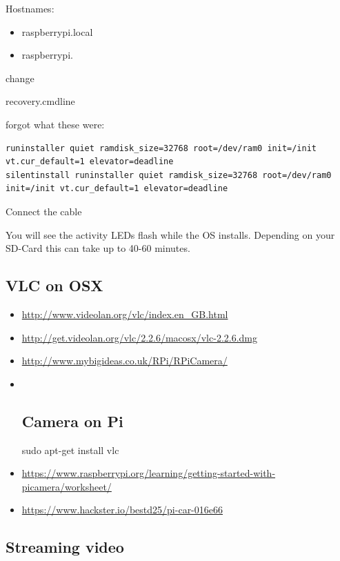 Hostnames:

\begin{itemize}
\tightlist
\item
  raspberrypi.local
\item
  raspberrypi.
\end{itemize}

change

recovery.cmdline

forgot what these were:

\begin{verbatim}
runinstaller quiet ramdisk_size=32768 root=/dev/ram0 init=/init vt.cur_default=1 elevator=deadline
silentinstall runinstaller quiet ramdisk_size=32768 root=/dev/ram0 init=/init vt.cur_default=1 elevator=deadline
\end{verbatim}

Connect the cable

You will see the activity LEDs flash while the OS installs. Depending on
your SD-Card this can take up to 40-60 minutes.

\subsection{VLC on OSX}\label{vlc-on-osx}

\begin{itemize}
\item
  \url{http://www.videolan.org/vlc/index.en_GB.html}
\item
  \url{http://get.videolan.org/vlc/2.2.6/macosx/vlc-2.2.6.dmg}
\item
  \url{http://www.mybigideas.co.uk/RPi/RPiCamera/}
\item ~
  \subsection{Camera on Pi}\label{camera-on-pi}

  sudo apt-get install vlc
\item
  \url{https://www.raspberrypi.org/learning/getting-started-with-picamera/worksheet/}
\item
  \url{https://www.hackster.io/bestd25/pi-car-016e66}
\end{itemize}

\subsection{Streaming video}\label{streaming-video}

